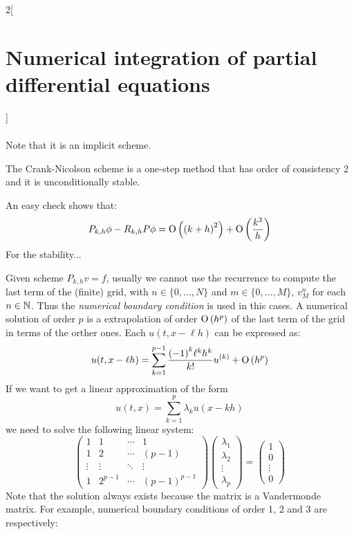 \documentclass[../../../main_math.tex]{subfiles}
\begin{document}
\begin{multicols}{2}[\section{Numerical integration of partial differential equations}]
\begin{proposition}
\begin{multline*}
    \end{multline*}
    Note that it is an implicit scheme.
  \end{proposition}
  \begin{proposition}
    The Crank-Nicolson scheme is a one-step method that has order of consistency 2 and it is unconditionally stable.
  \end{proposition}
  \begin{sproof}
    An easy check shows that:
    $$P_{k,h}\phi-R_{k,h}P\phi=\mathrm{O}\left({(k+h)}^2\right)+\mathrm{O}\left(\frac{k^3}{h}\right)$$
    For the stability...
  \end{sproof}
  \begin{definition}
    Given scheme $P_{k,h}{v}={f}$, usually we cannot use the recurrence to compute the last term of the (finite) grid, with $n\in\{0,\ldots,N\}$ and $m\in\{0,\ldots,M\}$, $v_M^{n}$ for each $n\in\mathbb{N}$. Thus the \emph{numerical boundary condition} is used in this cases. A numerical solution of order $p$ is a extrapolation of order $\mathrm{O}\left(h^p\right)$ of the last term of the grid in terms of the orther ones. Each $u(t,x-\ell h)$ can be expressed as: $$u(t,x-\ell h)=\sum_{k=1}^{p-1}\frac{{(-1)}^k \ell^kh^k}{k!}u^{(k)}+\mathrm{O}\left(h^p\right)$$
    If we want to get a linear approximation of the form
    $$u(t,x)=\sum_{k=1}^{p}\lambda_ku(x-kh)$$
    we need to solve the following linear system:
    $$
      \begin{pmatrix}
        1      & 1       & \cdots & 1             \\
        1      & 2       & \cdots & {(p-1)}       \\
        \vdots & \vdots  & \ddots & \vdots        \\
        1      & 2^{p-1} & \cdots & {(p-1)}^{p-1}
      \end{pmatrix}
      \begin{pmatrix}
        \lambda_1 \\
        \lambda_2 \\
        \vdots    \\
        \lambda_p
      \end{pmatrix}=
      \begin{pmatrix}
        1      \\
        0      \\
        \vdots \\
        0
      \end{pmatrix}
    $$
    Note that the solution always exists because the matrix is a Vandermonde matrix.
    For example, numerical boundary conditions of order 1, 2 and 3 are respectively:

\end{definition}
\end{multicols}
\end{document}
